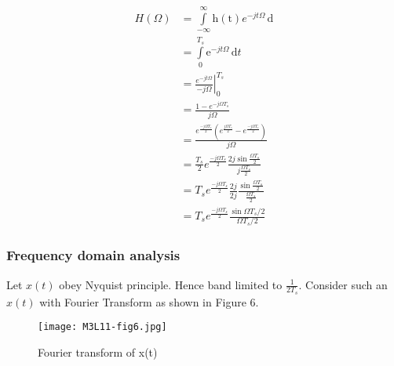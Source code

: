 \begin{align*}
H(\Omega) &=\int\limits_{-\infty}^{\infty}\mathrm{h(t)}{e}^{-jt\Omega}\,\mathrm{d}\\
&=\int\limits_{0}^{T_{s}}\mathrm{e}^{-jt\Omega}\,\mathrm{d}t\\
&=\left.\frac{e^{-jt\Omega}}{-j\Omega}\right|_0^{T_{s}}\\
&=\frac{1-e ^{-j\Omega T_s}}{j \Omega}\\
&=\frac{e^\frac{-j \Omega T_s}{2} \left(e^{\frac{j \Omega T_s}{2}} - e^{\frac{-j \Omega T_s}{2}}\right)}{j \Omega}\\
&=\frac{T_s}{2} e^{\frac{-j \Omega T_s}{2}} \frac{2j \sin{\frac{\Omega T_s}{2}}}{j \frac{\Omega T_s}{2}}\\
&=T_s e^\frac{-j \Omega T_s}{2}\frac{2j}{2j} \frac{\sin{\frac{\Omega T_s}{2}}}{\frac{\Omega T_s}{2}}\\
&=T_s e^{\frac{-j \Omega T_s}{2}} \frac{\sin{\Omega T_s/2}}{\Omega T_s/2}
\end{align*}





\subsubsection{Frequency domain analysis}

Let $x(t)$ obey Nyquist principle. Hence band limited to $\frac{1}{2 T_s}$.
Consider such an $x(t)$ with Fourier Transform as shown in Figure 6.

\begin{figure}[ht]
\centering
\texttt{[image: M3L11-fig6.jpg]}
\caption{\label{fig:6} Fourier transform of x(t)}
\end{figure}

